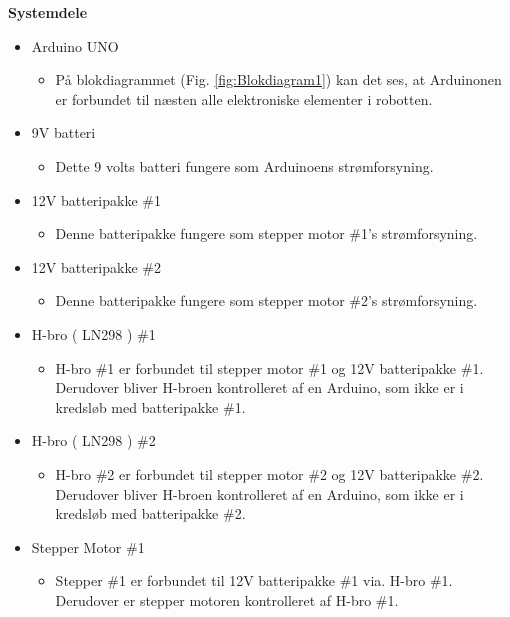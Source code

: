 \newpage
\textbf{Systemdele}
\begin{itemize}
	\item Arduino UNO
\begin{itemize}
\item På blokdiagrammet (Fig. \ref{fig:Blokdiagram1}) kan det ses, at Arduinonen er forbundet til næsten alle elektroniske elementer i robotten. 
\end{itemize}

	\item 9V batteri
\begin{itemize}
\item Dette 9 volts batteri fungere som Arduinoens strømforsyning.
\end{itemize}

	\item 12V batteripakke \#1
\begin{itemize}
\item Denne batteripakke fungere som stepper motor \#1’s strømforsyning.
\end{itemize}

	\item 12V batteripakke \#2
\begin{itemize}
\item Denne batteripakke fungere som stepper motor \#2’s strømforsyning.
\end{itemize}

	\item H-bro ( LN298 ) \#1
\begin{itemize}
\item H-bro \#1 er forbundet til stepper motor \#1 og 12V batteripakke \#1. Derudover bliver H-broen kontrolleret af en Arduino, som ikke er i kredsløb med batteripakke \#1.
\end{itemize}

	\item H-bro ( LN298 ) \#2
\begin{itemize}
\item H-bro \#2 er forbundet til stepper motor \#2 og 12V batteripakke \#2. Derudover bliver H-broen kontrolleret af en Arduino, som ikke er i kredsløb med batteripakke \#2.
\end{itemize}

	\item Stepper Motor \#1
\begin{itemize}
\item Stepper \#1 er forbundet til 12V batteripakke \#1 via. H-bro \#1. Derudover er stepper motoren kontrolleret af H-bro \#1. 
\end{itemize}


\end{itemize}
